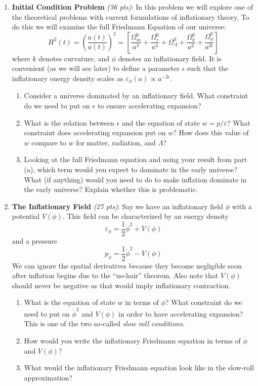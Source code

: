 \documentclass[12pt,preprint]{aastex}
\def\eps{\varepsilon}
\def\half{\frac{1}{2}}
\begin{document}
\begin{enumerate}
\item \textbf{Initial Condition Problem} \textit{(36 pts)}: In this problem we will explore one of the theoretical problems with current formulations of inflationary theory. To do this we will examine the full Friedmann Equation of our universe:
	$$ H^2(t) = \left ( \frac{\dot a(t)}{a(t)} \right ) ^2 = \left [ \frac{\Omega^0_m}{a^3} + \frac{\Omega^0_r}{a^4} + \Omega^0_\Lambda + \frac{\Omega^0_k}{a^2} + \frac{\Omega^0_\phi}{a^{2\epsilon}} \right ] $$
	where $k$ denotes curvature, and $\phi$ denotes an inflationary field. It is convenient (as we will see later) to define a parameter $\epsilon$ such that the inflationary energy density scales as $\eps_\phi(a) \propto a^{-2\epsilon}$. 
	\begin{enumerate}
	\item Consider a universe dominated by an inflationary field. What constraint do we need to put on $\epsilon$ to ensure accelerating expansion? 
	\item What is the relation between $\epsilon$ and the equation of state $w = p/\eps$? What constraint does accelerating expansion put on $w$? How does this value of $w$ compare to $w$ for matter, radiation, and $\Lambda$? 
	\item Looking at the full Friedmann equation and using your result from part (a), which term would you expect to dominate in the early universe? What (if anything) would you need to do to make inflation dominate in the early universe? Explain whether this is problematic. 
	\end{enumerate}

\item \textbf{The Inflationary Field} \textit{(27 pts)}: Say we have an inflationary field $\phi$ with a potential $V(\phi)$. This field can be characterized by an energy density 
$$ \eps_\phi = \half \dot \phi^2 + V(\phi)$$ 
and a pressure
$$ p_\phi = \half \dot \phi^2 - V(\phi)$$
We can ignore the spatial derivatives because they become negligible soon after inflation begins due to the ``no-hair'' theorem. Also note that $V(\phi)$ should never be negative as that would imply inflationary contraction. 
	\begin{enumerate}
	\item What is the equation of state $w$ in terms of $\phi$? What constraint do we need to put on $\dot \phi^2$ and $V(\phi)$ in order to have accelerating expansion? This is one of the two so-called \textit{slow roll conditions}. 
	\item How would you write the inflationary Friedmann equation in terms of $\dot\phi$ and $V(\phi)$? 
	\item What would the inflationary Friedmann equation look like in the slow-roll approximation? 
	\end{enumerate}


\end{enumerate}
\end{document}
